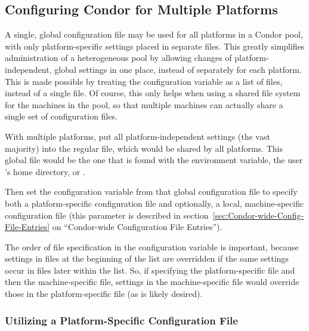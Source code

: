 \subsection{\label{sec:Multiple-Platforms}Configuring Condor for
Multiple Platforms} 

A single, global
configuration file may be used for all platforms in a Condor pool, with only
platform-specific settings placed in separate files.  This greatly
simplifies administration of a heterogeneous pool by allowing
changes of platform-independent, global settings in one place, instead of
separately for each platform.  This is made possible by treating the
 configuration variable as a
list of files, instead of a single file.  Of course, this only
helps when using a shared file system for the machines in the
pool, so that multiple machines can actually share a single set of
configuration files.

With multiple platforms, put all
platform-independent settings (the vast majority) into the regular
 file, which would be shared by all platforms.
This global file would be the one that is found with the
 environment variable, the user 's home
directory, or .

Then set the  configuration variable from that
global configuration file to specify both a platform-specific
configuration file and
optionally, a local, machine-specific configuration file (this parameter is
described in section~\ref{sec:Condor-wide-Config-File-Entries} on
``Condor-wide Configuration File Entries'').

The order of file specification in the
 configuration variable is important,
because settings
in files at the beginning of the list are overridden if the same
settings occur in files later within the list.  So, if specifying the
platform-specific file and then the machine-specific file, settings in
the machine-specific file would override those in the
platform-specific file (as is likely desired).  

\subsubsection{\label{sec:Specify-Platform-Files}Utilizing a
Platform-Specific Configuration File} 

